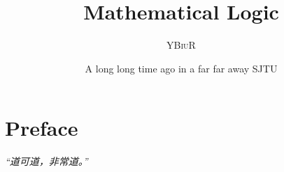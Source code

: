 \documentclass[oneside]{book}
\title{Mathematical Logic}
\author{\textsc{YBiuR}}
\date{A long long time ago in a far far away SJTU}
\theoremstyle{definition}
\theoremstyle{remark}
\begin{document}
\setlength{\parskip}{1em}
\setlength{\parindent}{0em}

\frontmatter
\maketitle
\chapter*{Preface}
\emph{“道可道，非常道。”}

\mainmatter
\tableofcontents
\begin{spacing}{1.2}





\end{spacing}
\end{document}
